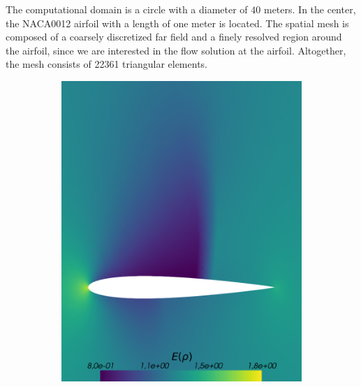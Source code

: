 The computational domain is a circle with a diameter of $40$ meters. In the center, the NACA0012 airfoil with a length of one meter is located. The spatial mesh is composed of a coarsely discretized far field and a finely resolved region around the airfoil, since we are interested in the flow solution at the airfoil. Altogether, the mesh consists of 22361 triangular elements.

\begin{figure}[h!]
\centering
	\begin{subfigure}{0.5\linewidth}
		\centering
				\includegraphics[scale=0.2]{figs/Euler1DPlots5/sc100_ERho.png}
		\label{fig:referenceSolutionsub1}
	\end{subfigure}%
	\begin{subfigure}{0.5\linewidth}
		\centering

\end{subfigure}
\end{figure}
